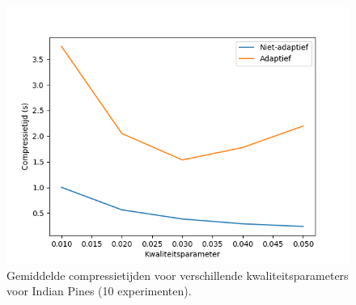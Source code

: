 \begin{figure}[H]
  \centering
  \includegraphics[scale=0.7]{images/adaptive_timings_Indian_Pines.png}
  \caption{Gemiddelde compressietijden voor verschillende kwaliteitsparameters voor Indian Pines (10 experimenten).}
  \label{fig:adaptive_timings_Indian_Pines}
\end{figure}
